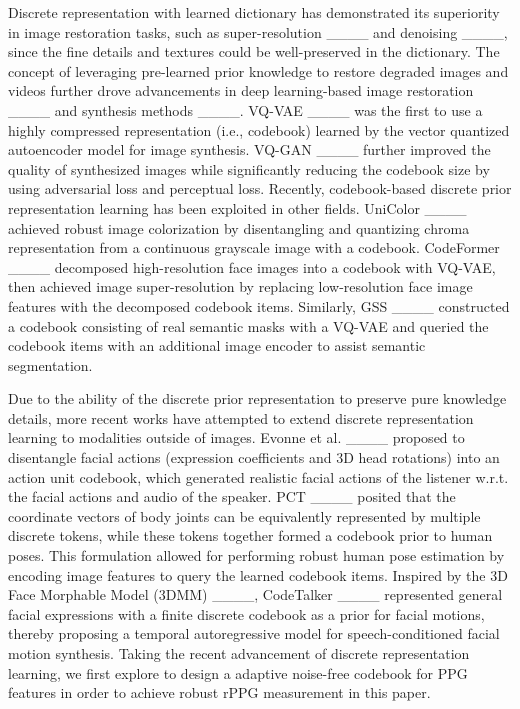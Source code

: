Discrete representation with learned dictionary has demonstrated its superiority in image restoration tasks, such as super-resolution ____ and denoising ____, since the fine details and textures could be well-preserved in the dictionary. The concept of leveraging pre-learned prior knowledge to restore degraded images and videos further drove advancements in deep learning-based image restoration ____ and synthesis methods ____. VQ-VAE ____ was the first to use a highly compressed representation (i.e., codebook) learned by the vector quantized autoencoder model for image synthesis. VQ-GAN ____ further improved the quality of synthesized images while significantly reducing the codebook size by using adversarial loss and perceptual loss. Recently, codebook-based discrete prior representation learning has been exploited in other fields. UniColor ____ achieved robust image colorization by disentangling and quantizing chroma representation from a continuous grayscale image with a codebook. CodeFormer ____ decomposed high-resolution face images into a codebook with VQ-VAE, then achieved image super-resolution by replacing low-resolution face image features with the decomposed codebook items. Similarly, GSS ____ constructed a codebook consisting of real semantic masks with a VQ-VAE and queried the codebook items with an additional image encoder to assist semantic segmentation. 

Due to the ability of the discrete prior representation to preserve pure knowledge details, more recent works have attempted to extend discrete representation learning to modalities outside of images. Evonne et al. ____ proposed to disentangle facial actions (expression coefficients and 3D head rotations) into an action unit codebook, which generated realistic facial actions of the listener w.r.t. the facial actions and audio of the speaker. PCT ____ posited that the coordinate vectors of body joints can be equivalently represented by multiple discrete tokens, while these tokens together formed a codebook prior to human poses. This formulation allowed for performing robust human pose estimation by encoding image features to query the learned codebook items. Inspired by the 3D Face Morphable Model (3DMM) ____, CodeTalker ____ represented general facial expressions with a finite discrete codebook as a prior for facial motions, thereby proposing a temporal autoregressive model for speech-conditioned facial motion synthesis. Taking the recent advancement of discrete representation learning, we first explore to design a adaptive noise-free codebook for PPG features in order to achieve robust rPPG measurement in this paper.

